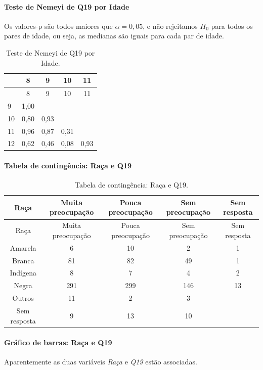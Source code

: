 \documentclass[]{article}
\let\oldparagraph\paragraph
\renewcommand{\paragraph}[1]{\oldparagraph{#1}\mbox{}}
\begin{document}
\hypertarget{teste-de-nemeyi-de-q19-por-idade}{%
\paragraph{Teste de Nemeyi de Q19 por Idade}\label{teste-de-nemeyi-de-q19-por-idade}}

Os valores-p são todos maiores que \(\alpha=0,05\), e não rejeitamos \(H_0\) para todos os pares de idade, ou seja, as medianas são iguais para cada par de idade.

\begin{longtable}[]{@{}lcccc@{}}
\caption{\label{tab:unnamed-chunk-270}Teste de Nemeyi de Q19 por Idade.}\tabularnewline
\toprule
& 8 & 9 & 10 & 11\tabularnewline
\midrule
\endfirsthead
\toprule
& 8 & 9 & 10 & 11\tabularnewline
\midrule
\endhead
9 & 1,00 & & &\tabularnewline
10 & 0,80 & 0,93 & &\tabularnewline
11 & 0,96 & 0,87 & 0,31 &\tabularnewline
12 & 0,62 & 0,46 & 0,08 & 0,93\tabularnewline
\bottomrule
\end{longtable}

\cleardoublepage

\hypertarget{tabela-de-continguxeancia-rauxe7a-e-q19}{%
\paragraph{Tabela de contingência: Raça e Q19}\label{tabela-de-continguxeancia-rauxe7a-e-q19}}

\begin{longtable}[]{@{}ccccc@{}}
\caption{\label{tab:unnamed-chunk-271}Tabela de contingência: Raça e Q19.}\tabularnewline
\toprule
Raça & Muita preocupação & Pouca preocupação & Sem preocupação & Sem resposta\tabularnewline
\midrule
\endfirsthead
\toprule
Raça & Muita preocupação & Pouca preocupação & Sem preocupação & Sem resposta\tabularnewline
\midrule
\endhead
Amarela & 6 & 10 & 2 & 1\tabularnewline
Branca & 81 & 82 & 49 & 1\tabularnewline
Indígena & 8 & 7 & 4 & 2\tabularnewline
Negra & 291 & 299 & 146 & 13\tabularnewline
Outros & 11 & 2 & 3 &\tabularnewline
Sem resposta & 9 & 13 & 10 &\tabularnewline
\bottomrule
\end{longtable}

\hypertarget{gruxe1fico-de-barras-rauxe7a-e-q19}{%
\paragraph{Gráfico de barras: Raça e Q19}\label{gruxe1fico-de-barras-rauxe7a-e-q19}}

Aparentemente as duas variáveis \emph{Raça} e \emph{Q19} estão associadas.
\end{document}
